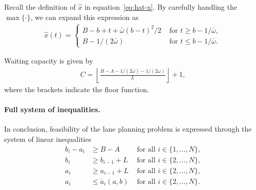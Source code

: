 \documentclass[a4paper]{article}
\theoremstyle{definition}
\theoremstyle{plain}
\begin{document}
Recall the definition of $\hat{x}$ in equation~\eqref{eq:hat-x}. By carefully
handling the $\max\{\cdot\}$, we can expand this expression as
\begin{align}
  \hat{x}(t) =
  \begin{cases}
    B - b + t + \bar{\omega} (b-t)^{2} / 2 &\text{ for } t \geq b - 1/\bar{\omega} , \\
    B - 1/(2\bar{\omega}) &\text{ for } t \leq b - 1/\bar{\omega} .
  \end{cases}
\end{align}

Waiting capacity is given by
\begin{align}
  C = \left\lfloor \frac{B-A-1/(2\bar{\omega}) -1/(2\omega)}{L} \right\rfloor + 1 ,
\end{align}
where the brackets indicate the floor function.


\paragraph{Full system of inequalities.}
In conclusion, feasibility of the lane planning problem is expressed through the
system of linear inequalities
\begin{subequations}
\begin{align}
  b_{i} - a_{i} &\geq B - A &\text{ for all } i \in \{1, \dots, N\}, \\
  b_{i} &\geq  b_{i-1} + L &\text{ for all } i \in \{2, \dots, N\} , \\
  a_{i} &\geq  a_{i-1} + L &\text{ for all } i \in \{2, \dots, N\} , \\
  a_{i} &\leq \check{a}_{i}(a, b) &\text{ for all } i \in \{2, \dots, N \} .
\end{align}
\end{subequations}
\end{document}
